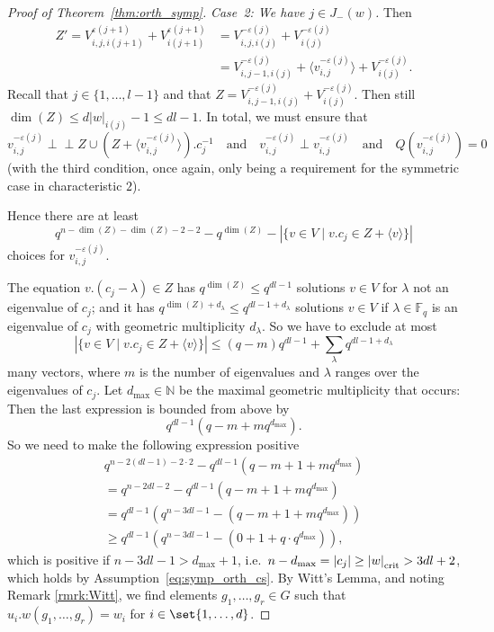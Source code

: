 \documentclass[a4paper,12pt]{amsproc}
\newcommand{\norm}[1]{\left\lvert#1\right\rvert}%
\newcommand{\card}[1]{\left\lvert#1\right\rvert}%
\newcommand{\perpnotin}{\mathrel{\perp\!\!\!\perp}}%
\theoremstyle{plain}
\theoremstyle{definition}
\begin{document}
\begin{proof}[Proof of Theorem~\ref{thm:orth_symp}]
\vspace{3mm}
		
\noindent\emph{Case~2: We have $j\in J_-(w)$.} Then
\begin{align*}
Z'=V_{i,j,i(j+1)}^{\varepsilon(j+1)}+V_{i(j+1)}^{\varepsilon(j+1)}&=V_{i,j,i(j)}^{-\varepsilon(j)}+V_{i(j)}^{-\varepsilon(j)}\\
&=V_{i,j-1,i(j)}^{-\varepsilon(j)}+\langle v_{i,j}^{-\varepsilon(j)}\rangle+V_{i(j)}^{-\varepsilon(j)}.
\end{align*}
Recall that $j\in\{1,\ldots,l-1\}$ and that $Z=V_{i,j-1,i(j)}^{-\varepsilon(j)}+V_{i(j)}^{-\varepsilon(j)}$. Then still $\dim(Z)\leq d\norm{w}_{i(j)}-1\leq dl-1$.
In total, we must ensure that
$$
v_{i,j}^{-\varepsilon(j)}\perpnotin Z\cup (Z+\langle v_{i,j}^{-\varepsilon(j)}\rangle).c_j^{-1}\quad\text{and}\quad v_{i,j}^{-\varepsilon(j)}\perp v_{i,j}^{-\varepsilon(j)} \quad\text{and}\quad Q(v_{i,j}^{-\varepsilon(j)}) = 0
$$ 
(with the third condition, once again, only being a requirement 
for the symmetric case in characteristic $2$). 

Hence there are at least
$$
q^{n-\dim(Z)-\dim(Z)-2-2}-q^{\dim(Z)}-\card{\{v\in V \mid v.c_j\in Z+\langle v\rangle\}}
$$
choices for $v_{i,j}^{-\varepsilon(j)}$.
		
The equation $v.(c_j-\lambda)\in Z$ has $q^{\dim(Z)}\leq q^{dl-1}$ solutions $v\in V$ for $\lambda$ not an eigenvalue of $c_j$; and it has $q^{\dim(Z)+d_\lambda}\leq q^{dl-1+d_{\lambda}}$ solutions $v\in V$ if $\lambda\in\mathbb{F}_q$ is an eigenvalue of $c_j$ with geometric multiplicity $d_\lambda$. So we have to exclude at most
$$
\card{\{v\in V \mid v.c_j\in Z+\langle v\rangle\}}\leq(q-m)q^{dl-1}+\sum_{\lambda}{q^{dl-1+d_\lambda}}
$$
many vectors, where $m$ is the number of eigenvalues and $\lambda$ ranges over the eigenvalues of $c_j$. Let $d_{\max}\in\mathbb{N}$ be the maximal geometric multiplicity that occurs:
Then the last expression is bounded from above by 
$$
q^{dl-1}(q-m+mq^{d_{\max}}).
$$
So we need to make the following expression positive
\begin{align*}
q^{n-2(dl-1)-2\cdot 2}-q^{dl-1}(q-m+1+mq^{d_{\max}})\\
=q^{n-2dl-2}-q^{dl-1}(q-m+    1+mq^{d_{\max}})\\
=q^{dl-1}(q^{n-3dl-1}-(q-m+    1+mq^{d_{\max}}))\\
\geq q^{dl-1}(q^{n-3dl-1}-(0+    1+q\cdot q^{d_{\max}})), 
\end{align*}
which is positive if $n-3dl-1>d_{\max}+1$, i.e.\ $n-d_{\max}=\norm{c_j}\geq \norm{w}_{\rm crit}>3dl+2$, which holds by Assumption~\eqref{eq:symp_orth_cs}. 
By Witt's Lemma, and noting Remark \ref{rmrk:Witt}, 
we find elements $g_1,\ldots,g_r\in G$ such that 
$u_i.w(g_1,\ldots,g_r)=w_i$ for $i\in\set{1,\ldots,d}$.
\end{proof}
	
\end{document}
